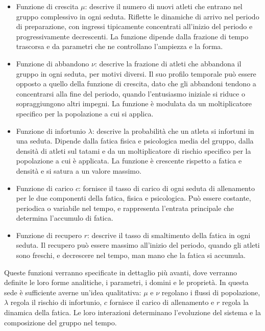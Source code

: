 \begin{itemize}
    \item Funzione di crescita $\mu$: descrive il numero di nuovi atleti che entrano nel gruppo complessivo in ogni seduta. Riflette le dinamiche di arrivo nel periodo di preparazione, con ingressi tipicamente concentrati all'inizio del periodo e progressivamente decrescenti. La funzione dipende dalla frazione di tempo trascorsa e da parametri che ne controllano l'ampiezza e la forma.
    \item Funzione di abbandono $\nu$: descrive la frazione di atleti che abbandona il gruppo in ogni seduta, per motivi diversi. Il suo profilo temporale può essere opposto a quello della funzione di crescita, dato che gli abbandoni tendono a concentrarsi alla fine del periodo, quando l'entusiasmo iniziale si riduce o sopraggiungono altri impegni. La funzione è modulata da un moltiplicatore specifico per la popolazione a cui si applica.
    \item Funzione di infortunio $\lambda$: descrive la probabilità che un atleta si infortuni in una seduta. Dipende dalla fatica fisica e psicologica media del gruppo, dalla densità di atleti sul tatami e da un moltiplicatore di rischio specifico per la popolazione a cui è applicata. La funzione è crescente rispetto a fatica e densità e si satura a un valore massimo.
    \item Funzione di carico $c$: fornisce il tasso di carico di ogni seduta di allenamento per le due componenti della fatica, fisica e psicologica. Può essere costante, periodica o variabile nel tempo, e rappresenta l'entrata principale che determina l'accumulo di fatica.
    \item Funzione di recupero $r$: descrive il tasso di smaltimento della fatica in ogni seduta. Il recupero può essere massimo all'inizio del periodo, quando gli atleti sono freschi, e decrescere nel tempo, man mano che la fatica si accumula.
\end{itemize}

Queste funzioni verranno specificate in dettaglio più avanti, dove verranno definite le loro forme analitiche, i parametri, i domini e le proprietà. In questa sede è sufficiente averne un'idea qualitativa: $\mu$ e $\nu$ regolano i flussi di popolazione, $\lambda$ regola il rischio di infortunio, $c$ fornisce il carico di allenamento e $r$ regola la dinamica della fatica. Le loro interazioni determinano l'evoluzione del sistema e la composizione del gruppo nel tempo.